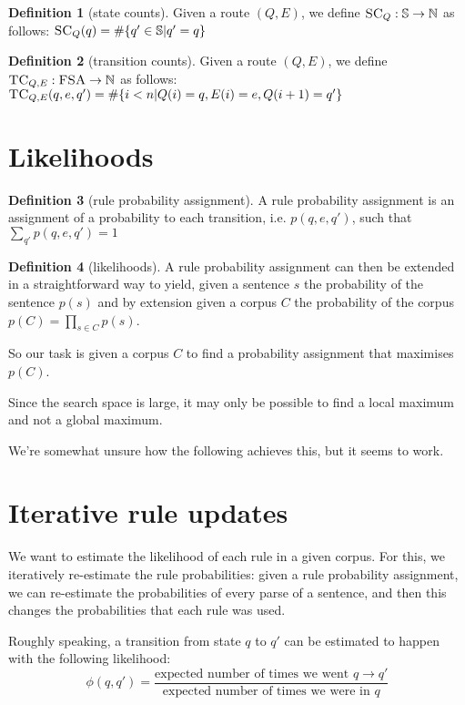 \documentclass[12pt]{article}
\theoremstyle{definition}
\newtheorem{definition}{Definition}[section]
\begin{document}
\begin{definition}[state counts]
  Given a route $(Q,E)$, we define $\textsc{SC}_Q : \mathbb{S} \rightarrow\mathbb{N}$ as follows: $\textsc{SC}_Q(q) = \#\{ q'\in \mathbb{S} | q'=q \}$
\end{definition}


\begin{definition}[transition counts]
  Given a route $(Q,E)$, we define $\textsc{TC}_{Q,E} : \textsc{FSA} \rightarrow\mathbb{N}$ as follows: $\textsc{TC}_{Q,E}(q,e,q') = \#\{ i<n | Q(i)=q,E(i)=e,Q({i+1})=q'\}$
\end{definition}


\section{Likelihoods}

\begin{definition}[rule probability assignment]
A rule probability assignment is an assignment of a probability to each transition, i.e. $p(q,e,q')$, such that $\sum_{q'}p(q,e,q')=1$
\end{definition}

\begin{definition}[likelihoods]
A rule probability assignment can then be extended in a straightforward way to yield, given a sentence $s$ the probability of the sentence $p(s)$ and by extension given a corpus $C$ the probability of the corpus $p(C)=\prod_{s\in C}p(s)$.
\end{definition}

So our task is given a corpus $C$ to find a probability assignment that maximises $p(C)$. 

Since the search space is large, it may only be possible to find a local maximum and not a global maximum.

We're somewhat unsure how the following achieves this, but it seems to work.


\section{Iterative rule updates}


We want to estimate the likelihood of each rule in a given corpus. For this, we iteratively re-estimate the rule probabilities: given a rule probability assignment, we can re-estimate the probabilities of every parse of a sentence, and then this changes the probabilities that each rule was used.

Roughly speaking, a transition from state $q$ to $q'$ can be estimated to happen with the following likelihood:
$$\phi(q,q') = \frac{\textrm{expected number of times we went }q\rightarrow q'}{\textrm{expected number of times we were in }q}$$
\end{document}
